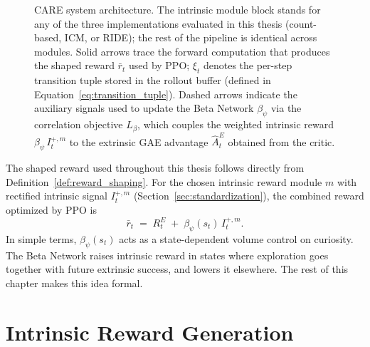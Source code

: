 \begin{figure}[H]
\caption[CARE system architecture.]{CARE system architecture. The intrinsic module block stands for any of the three implementations evaluated in this thesis (count-based, ICM, or RIDE); the rest of the pipeline is identical across modules. Solid arrows trace the forward computation that produces the shaped reward $\bar r_t$ used by PPO; $\xi_t$ denotes the per-step transition tuple stored in the rollout buffer (defined in Equation~\eqref{eq:transition_tuple}). Dashed arrows indicate the auxiliary signals used to update the Beta Network $\beta_\psi$ via the correlation objective $L_\beta$, which couples the weighted intrinsic reward $\beta_\psi\, I_t^{+,m}$ to the extrinsic GAE advantage $\hat A_t^{E}$ obtained from the critic.}
\label{fig:care_arch}
\end{figure}

The shaped reward used throughout this thesis follows directly from Definition~\ref{def:reward_shaping}. For the chosen intrinsic reward module $m$ with rectified intrinsic signal $I_t^{+,m}$ (Section~\ref{sec:standardization}), the combined reward optimized by PPO is
\begin{equation}
\bar{r}_t \;=\; R_t^E \;+\; \beta_\psi(s_t)\, I_t^{+,m}.
\label{eq:combined_reward}
\end{equation}
In simple terms, $\beta_\psi(s_t)$ acts as a state-dependent volume control on curiosity. The Beta Network raises intrinsic reward in states where exploration goes together with future extrinsic success, and lowers it elsewhere. The rest of this chapter makes this idea formal.

\section{Intrinsic Reward Generation}
\label{sec:intrinsic_modules}

